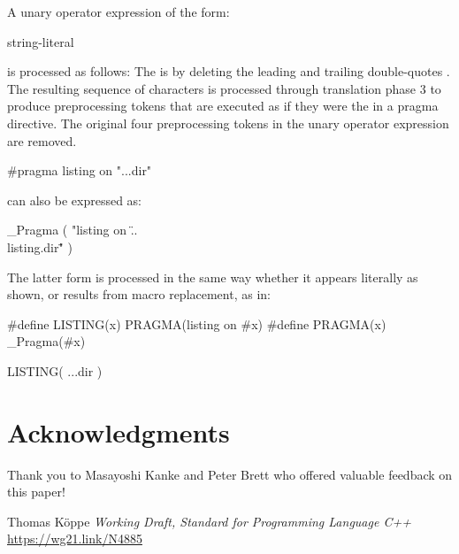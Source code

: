 \documentclass{wg21}
\begin{document}
\pnum
A unary operator expression of the form:

\begin{ncbnf}
     \terminal{(} string-literal \terminal{)}
\end{ncbnf}

is processed as follows: The  
is  by
 deleting the leading and trailing
double-quotes . The resulting sequence of characters is processed through translation phase 3
to produce preprocessing tokens that are executed as if they were the
 in a pragma directive. The original four preprocessing
tokens in the unary operator expression are removed.

\pnum
\begin{example}
\begin{codeblock}
    #pragma listing on "..\listing.dir"
\end{codeblock}
can also be expressed as:
\begin{codeblock}
    _Pragma ( "listing on \"..\\listing.dir\"" )
\end{codeblock}
The latter form is processed in the same way whether it appears literally
as shown, or results from macro replacement, as in:
\begin{codeblock}
    #define LISTING(x) PRAGMA(listing on #x)
    #define PRAGMA(x) _Pragma(#x)

    LISTING( ..\listing.dir )
\end{codeblock}
\end{example}


\section{Acknowledgments}

Thank you to Masayoshi Kanke and Peter Brett who offered valuable feedback on this paper!






\renewcommand{\section}[2]{}%
\begin{thebibliography}{9}

Thomas Köppe
\emph{Working Draft, Standard for Programming Language C++}\newline
\url{https://wg21.link/N4885}

\end{thebibliography}
\end{document}
